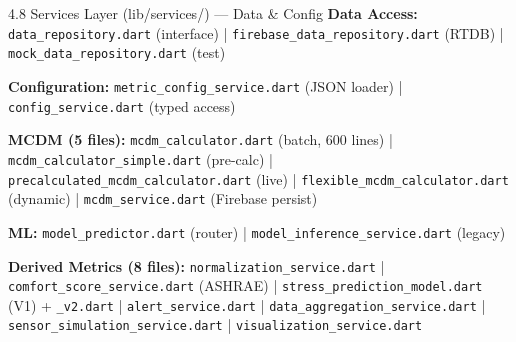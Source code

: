 \documentclass[aspectratio=169]{beamer}
\begin{document}
\begin{frame}[allowframebreaks]{4.8 Services Layer (lib/services/) --- Data \& Config}
  \small
  \textbf{Data Access:}
  \texttt{data\_repository.dart} (interface) | \texttt{firebase\_data\_repository.dart} (RTDB) | \texttt{mock\_data\_repository.dart} (test)

  \vspace{0.1cm}
  \textbf{Configuration:}
  \texttt{metric\_config\_service.dart} (JSON loader) | \texttt{config\_service.dart} (typed access)

  \vspace{0.1cm}
  \textbf{MCDM (5 files):}
  \texttt{mcdm\_calculator.dart} (batch, 600 lines) | \texttt{mcdm\_calculator\_simple.dart} (pre-calc) | \texttt{precalculated\_mcdm\_calculator.dart} (live) | \texttt{flexible\_mcdm\_calculator.dart} (dynamic) | \texttt{mcdm\_service.dart} (Firebase persist)

  \vspace{0.1cm}
  \textbf{ML:}
  \texttt{model\_predictor.dart} (router) | \texttt{model\_inference\_service.dart} (legacy)

  \vspace{0.1cm}
  \textbf{Derived Metrics (8 files):}
  \texttt{normalization\_service.dart} | \texttt{comfort\_score\_service.dart} (ASHRAE) | \texttt{stress\_prediction\_model.dart} (V1) + \texttt{\_v2.dart} | \texttt{alert\_service.dart} | \texttt{data\_aggregation\_service.dart} | \texttt{sensor\_simulation\_service.dart} | \texttt{visualization\_service.dart}
\end{frame}
\end{document}
